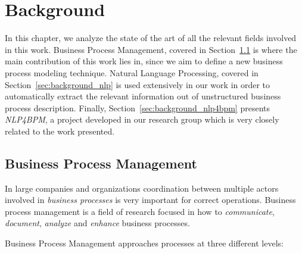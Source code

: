 \chapter{Background}
\label{cha:background}

In this chapter, we analyze the state of the art of all the relevant fields
involved in this work. Business Process Management, covered in
Section~\ref{sec:background_bpm} is where the main contribution of this work
lies in, since we aim to define a new business process modeling technique.
Natural Language Processing, covered in Section~\ref{sec:background_nlp} is used
extensively in our work in order to automatically extract the relevant
information out of unstructured business process description. Finally,
Section~\ref{sec:background_nlp4bpm} presents \emph{NLP4BPM}, a project
developed in our research group which is very closely related to the work
presented.




\section{Business Process Management}
\label{sec:background_bpm}


In large companies and organizations coordination between multiple actors
involved in \textit{business processes} is very important for correct
operations. Business process management is a field of research focused in how to  
\textit{communicate}, \textit{document}, \textit{analyze} and \textit{enhance}
business processes.

Business Process Management approaches processes at three different
levels\cite{mendling2017challenges}:

